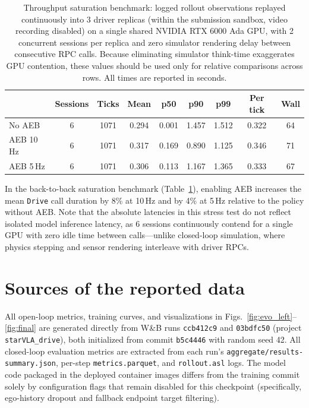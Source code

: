\begin{table}[!htb]
\centering\scriptsize
\caption{Throughput saturation benchmark: logged rollout observations replayed continuously into 3 driver replicas (within the submission sandbox, video recording disabled) on a single shared NVIDIA RTX 6000 Ada GPU, with 2 concurrent sessions per replica and zero simulator rendering delay between consecutive RPC calls. Because eliminating simulator think-time exaggerates GPU contention, these values should be used only for relative comparisons across rows. All times are reported in seconds.}
\label{tab:app_load}
\begin{tabular}{lcccccccc}
\toprule
 & Sessions & Ticks & Mean & p50 & p90 & p99 & Per tick & Wall \\
\midrule
No AEB & 6 & 1071 & 0.294 & 0.001 & 1.457 & 1.512 & 0.322 & 64 \\
AEB 10\,Hz & 6 & 1071 & 0.317 & 0.169 & 0.890 & 1.125 & 0.346 & 71 \\
AEB 5\,Hz & 6 & 1071 & 0.306 & 0.113 & 1.167 & 1.365 & 0.333 & 67 \\
\bottomrule
\end{tabular}
\end{table}

In the back-to-back saturation benchmark (Table~\ref{tab:app_load}), enabling AEB increases the mean \texttt{Drive} call duration by 8\% at 10\,Hz and by 4\% at 5\,Hz relative to the policy without AEB. Note that the absolute latencies in this stress test do not reflect isolated model inference latency, as 6 sessions continuously contend for a single GPU with zero idle time between calls---unlike closed-loop simulation, where physics stepping and sensor rendering interleave with driver RPCs.

\FloatBarrier
\section{Sources of the reported data}
\label{app:sources}
All open-loop metrics, training curves, and visualizations in Figs.~\ref{fig:evo_left}--\ref{fig:final} are generated directly from W\&B runs \texttt{ccb412c9} and \texttt{03bdfc50} (project \texttt{starVLA\_drive}), both initialized from commit \texttt{b5c4446} with random seed 42. All closed-loop evaluation metrics are extracted from each run's \texttt{aggregate/results-summary.json}, per-step \texttt{metrics.parquet}, and \texttt{rollout.asl} logs. The model code packaged in the deployed container images differs from the training commit solely by configuration flags that remain disabled for this checkpoint (specifically, ego-history dropout and fallback endpoint target filtering).
